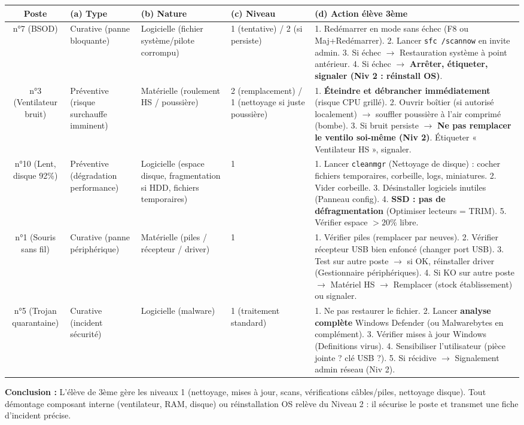\documentclass[11pt]{article}
\begin{document}
\begin{exoresolu}
\begin{center}
\begin{tabularx}{\linewidth}{|c|X|X|X|X|}
\hline
\rowcolor{popblueL}
\textbf{Poste} & \textbf{(a) Type} & \textbf{(b) Nature} & \textbf{(c) Niveau} & \textbf{(d) Action élève 3ème} \\
\hline
n°7 (BSOD) & Curative (panne bloquante) & Logicielle (fichier système/pilote corrompu) & 1 (tentative) / 2 (si persiste) & 1. Redémarrer en mode sans échec (F8 ou Maj+Redémarrer). 2. Lancer \texttt{sfc /scannow} en invite admin. 3. Si échec $\rightarrow$ Restauration système à point antérieur. 4. Si échec $\rightarrow$ \textbf{Arrêter, étiqueter, signaler (Niv 2 : réinstall OS)}. \\
\hline
n°3 (Ventilateur bruit) & Préventive (risque surchauffe imminent) & Matérielle (roulement HS / poussière) & 2 (remplacement) / 1 (nettoyage si juste poussière) & 1. \textbf{Éteindre et débrancher immédiatement} (risque CPU grillé). 2. Ouvrir boîtier (si autorisé localement) $\rightarrow$ souffler poussière à l'air comprimé (bombe). 3. Si bruit persiste $\rightarrow$ \textbf{Ne pas remplacer le ventilo soi-même (Niv 2)}. Étiqueter « Ventilateur HS », signaler. \\
\hline
n°10 (Lent, disque 92\%) & Préventive (dégradation performance) & Logicielle (espace disque, fragmentation si HDD, fichiers temporaires) & 1 & 1. Lancer \texttt{cleanmgr} (Nettoyage de disque) : cocher fichiers temporaires, corbeille, logs, miniatures. 2. Vider corbeille. 3. Désinstaller logiciels inutiles (Panneau config). 4. \textbf{SSD : pas de défragmentation} (Optimiser lecteurs = TRIM). 5. Vérifier espace $> 20\%$ libre. \\
\hline
n°1 (Souris sans fil) & Curative (panne périphérique) & Matérielle (piles / récepteur / driver) & 1 & 1. Vérifier piles (remplacer par neuves). 2. Vérifier récepteur USB bien enfoncé (changer port USB). 3. Test sur autre poste $\rightarrow$ si OK, réinstaller driver (Gestionnaire périphériques). 4. Si KO sur autre poste $\rightarrow$ Matériel HS $\rightarrow$ Remplacer (stock établissement) ou signaler. \\
\hline
n°5 (Trojan quarantaine) & Curative (incident sécurité) & Logicielle (malware) & 1 (traitement standard) & 1. Ne pas restaurer le fichier. 2. Lancer \textbf{analyse complète} Windows Defender (ou Malwarebytes en complément). 3. Vérifier mises à jour Windows (Definitions virus). 4. Sensibiliser l'utilisateur (pièce jointe ? clé USB ?). 5. Si récidive $\rightarrow$ Signalement admin réseau (Niv 2). \\
\hline
\end{tabularx}
\end{center}

\textbf{Conclusion :} L'élève de 3ème gère les niveaux 1 (nettoyage, mises à jour, scans, vérifications câbles/piles, nettoyage disque). Tout démontage composant interne (ventilateur, RAM, disque) ou réinstallation OS relève du Niveau 2 : il sécurise le poste et transmet une fiche d'incident précise.
\end{exoresolu}
\end{document}
